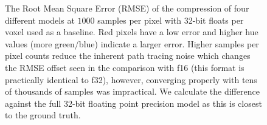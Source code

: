 \begin{figure}[H]
    \caption{The Root Mean Square Error (RMSE) of the compression of four different models at $1000$ samples per pixel with 32-bit floats per voxel used as a baseline. Red pixels have a low error and higher hue values (more green/blue) indicate a larger error. Higher samples per pixel counts reduce the inherent path tracing noise which changes the RMSE offset seen in the comparison with f16 (this format is practically identical to f32), however, converging properly with tens of thousands of samples was impractical. We calculate the difference against the full 32-bit floating point precision model as this is closest to the ground truth.} \label{fig:block_compression}
\end{figure}


\begin{figure}[H]
    \centering
    \hfill
    \hfill
    \hfill

\end{figure}
